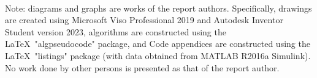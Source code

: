 \onehalfspacing
	

~\\
\noindent Note: diagrams and graphs are works of the report authors. Specifically, drawings are created using Microsoft Viso Professional 2019 and Autodesk Inventor Student version 2023, algorithms are constructed using the \LaTeX~"algpseudocode" package, and Code appendices are constructed using the \LaTeX~"listings" package (with data obtained from MATLAB\textsuperscript{\tiny\textregistered} R2016a Simulink). No work done by other persons is presented as that of the report author.
\newpage
\pagestyle{plain}
\begin{appendices}
			
\end{appendices}
	















































